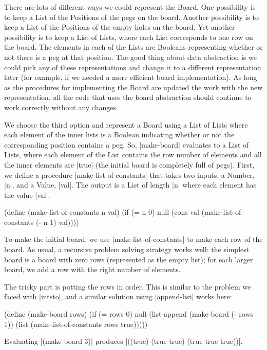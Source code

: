 \begin{schemeregion}
{There are lots of different ways we could represent the Board.  One possibility is to keep a List of the Positions of the pegs on the board.  Another possibility is to keep a List of the Positions of the empty holes on the board.  Yet another possibility is to keep a List of Lists, where each List corresponds to one row on the board.  The elements in each of the Lists are Booleans representing whether or not there is a peg at that position.  The good thing about data abstraction is we could pick any of these representations and change it to a different representation later (for example, if we needed a more efficient board implementation).  As long as the procedures for implementing the Board are updated the work with the new representation, all the code that uses the board abstraction should continue to work correctly without any changes.

We choose the third option and represent a Board using a List of Lists where each element of the inner lists is a Boolean indicating whether or not the corresponding position contains a peg.  So, \scheme|make-board| evaluates to a List of Lists, where each element of the List contains the row number of elements and all the inner elements are \schemeresult|true| (the initial board is completely full of pegs).  First, we define a procedure \scheme|make-list-of-constants| that takes two inputs, a Number, \scheme|n|, and a Value, \scheme|val|.  The output is a List of length \scheme|n| where each element has the value \scheme|val|.
\begin{schemedisplay}
(define (make-list-of-constants n val)
  (if (= n 0) null (cons val (make-list-of-constants (- n 1) val))))
\end{schemedisplay}
To make the initial board, we use \scheme|make-list-of-constants| to make each row of the board.  As usual, a recursive problem solving strategy works well: the simplest board is a board with zero rows (represented as the empty list); for each larger board, we add a row with the right number of elements.  

The tricky part is putting the rows in order.  This is similar to the problem we faced with \scheme|intsto|, and a similar solution using \scheme|append-list| works here:
\begin{schemedisplay}
(define (make-board rows) 
  (if (= rows 0) null
      (list-append (make-board (- rows 1)) 
                   (list (make-list-of-constants rows true)))))
\end{schemedisplay}

Evaluating \scheme|(make-board 3)| produces \scheme|((true) (true true) (true true true))|.

}
\end{schemeregion}
